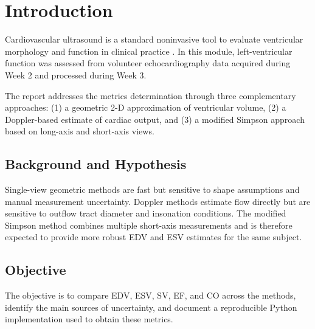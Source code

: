\section{Introduction}
Cardiovascular ultrasound is a standard noninvasive tool to evaluate ventricular morphology and function in clinical practice \cite{feigenbaum_echo}. In this module, left-ventricular function was assessed from volunteer echocardiography data acquired during Week 2 and processed during Week 3.

The report addresses the metrics determination through three complementary approaches: (1) a geometric 2-D approximation of ventricular volume, (2) a Doppler-based estimate of cardiac output, and (3) a modified Simpson approach based on long-axis and short-axis views.

\subsection{Background and Hypothesis}
Single-view geometric methods are fast but sensitive to shape assumptions and manual measurement uncertainty. Doppler methods estimate flow directly but are sensitive to outflow tract diameter and insonation conditions. The modified Simpson method combines multiple short-axis measurements and is therefore expected to provide more robust EDV and ESV estimates for the same subject.

\subsection{Objective}
The objective is to compare EDV, ESV, SV, EF, and CO across the methods, identify the main sources of uncertainty, and document a reproducible Python implementation used to obtain these metrics.

